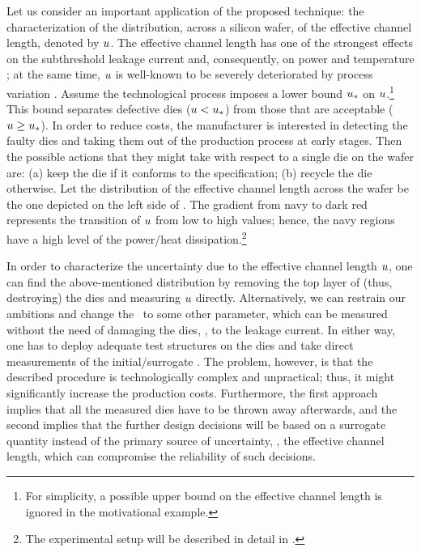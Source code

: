 
Let us consider an important application of the proposed technique: the characterization of the distribution, across a silicon wafer, of the effective channel length, denoted by $u$. The effective channel length has one of the strongest effects on the subthreshold leakage current and, consequently, on power and temperature \cite{juan2011, juan2012}; at the same time, $u$ is well-known to be severely deteriorated by process variation \cite{chandrakasan2001, srivastava2010}.
Assume the technological process imposes a lower bound $u_*$ on $u$.\footnote{For simplicity, a possible upper bound on the effective channel length is ignored in the motivational example.} This bound separates defective dies ($u < u_*$) from those that are acceptable ($u \geq u_*$).
In order to reduce costs, the manufacturer is interested in detecting the faulty dies and taking them out of the production process at early stages.
Then the possible actions that they might take with respect to a single die on the wafer are: (a) keep the die if it conforms to the specification; (b) recycle the die otherwise.
Let the distribution of the effective channel length across the wafer be the one depicted on the left side of .
The gradient from navy to dark red represents the transition of $u$ from low to high values; hence, the navy regions have a high level of the power/heat dissipation.\footnote{The experimental setup will be described in detail in .}

In order to characterize the uncertainty due to the effective channel length $u$, one can find the above-mentioned distribution by removing the top layer of (thus, destroying) the dies and measuring $u$ directly.
Alternatively, we can restrain our ambitions and change the \qoi\ to some other parameter, which can be measured without the need of damaging the dies, \eg, to the leakage current.
In either way, one has to deploy adequate test structures on the dies and take direct measurements of the initial/surrogate \qoi. The problem, however, is that the described procedure is technologically complex and unpractical; thus, it might significantly increase the production costs.
Furthermore, the first approach implies that all the measured dies have to be thrown away afterwards, and the second implies that the further design decisions will be based on a surrogate quantity instead of the primary source of uncertainty, \ie, the effective channel length, which can compromise the reliability of such decisions.

